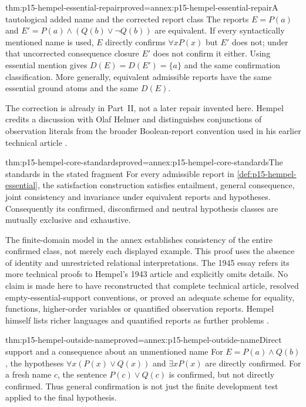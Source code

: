 \begin{hbtheorem}{thm:p15-hempel-essential-repair}{proved=annex:p15-hempel-essential-repair}{A tautological added name and the corrected report class}
The reports $E=P(a)$ and $E'=P(a)\land(Q(b)\lor\neg Q(b))$ are equivalent.
If every syntactically mentioned name is used, $E$ directly confirms
$\forall xP(x)$ but $E'$ does not; under that uncorrected consequence
closure $E'$ does not confirm it either. Using essential mention gives
$D(E)=D(E')=\{a\}$ and the same confirmation classification.
More generally, equivalent admissible reports have the same essential
ground atoms and the same $D(E)$.
\end{hbtheorem}

The correction is already in Part~II, not a later repair invented here.
Hempel credits a discussion with Olaf Helmer and distinguishes conjunctions
of observation literals from the broader Boolean-report convention used
in his earlier technical article
\parencite[II, pp.~110--111, n.~1]{Hempel1945ConfirmationII}.

\begin{hbtheorem}{thm:p15-hempel-core-standards}{proved=annex:p15-hempel-core-standards}{The standards in the stated fragment}
For every admissible report in \cref{def:p15-hempel-essential}, the
satisfaction construction satisfies entailment, general consequence,
joint consistency and invariance under equivalent reports and hypotheses.
Consequently its confirmed, disconfirmed and neutral hypothesis classes
are mutually exclusive and exhaustive.
\end{hbtheorem}

The finite-domain model in the annex establishes consistency of the entire
confirmed class, not merely each displayed example. This proof uses the
absence of identity and unrestricted relational interpretations. The 1945
essay refers its more technical proofs to Hempel's 1943 article and explicitly
omits details. No claim is made here to have reconstructed that complete
technical article, resolved empty-essential-support conventions, or proved
an adequate scheme for equality, functions, higher-order variables or
quantified observation reports. Hempel himself lists richer languages and
quantified reports as further problems
\parencite[II, pp.~108--111, notes; pp.~120--121]{Hempel1945ConfirmationII}.

\begin{hbtheorem}{thm:p15-hempel-outside-name}{proved=annex:p15-hempel-outside-name}{Direct support and a consequence about an unmentioned name}
For $E=P(a)\land Q(b)$, the hypotheses $\forall x(P(x)\lor Q(x))$ and
$\exists xP(x)$ are directly confirmed. For a fresh name $c$, the sentence
$P(c)\lor Q(c)$ is confirmed, but not directly confirmed. Thus general
confirmation is not just the finite development test applied to the final
hypothesis.
\end{hbtheorem}

